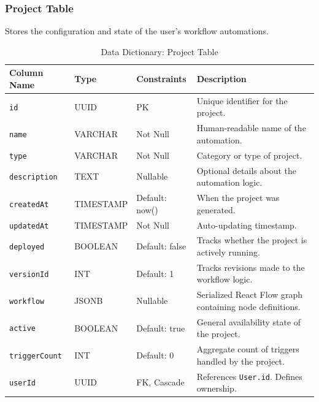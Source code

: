\subsubsection{Project Table}
Stores the configuration and state of the user's workflow automations.
\begin{table}[H]
\centering
\renewcommand{\arraystretch}{1.3}
\begin{tabularx}{\textwidth}{|l|l|l|X|}
\hline
\textbf{Column Name} & \textbf{Type} & \textbf{Constraints} & \textbf{Description} \\
\hline
\texttt{id} & UUID & PK & Unique identifier for the project. \\
\hline
\texttt{name} & VARCHAR & Not Null & Human-readable name of the automation. \\
\hline
\texttt{type} & VARCHAR & Not Null & Category or type of project. \\
\hline
\texttt{description} & TEXT & Nullable & Optional details about the automation logic. \\
\hline
\texttt{createdAt} & TIMESTAMP & Default: now() & When the project was generated. \\
\hline
\texttt{updatedAt} & TIMESTAMP & Not Null & Auto-updating timestamp. \\
\hline
\texttt{deployed} & BOOLEAN & Default: false & Tracks whether the project is actively running. \\
\hline
\texttt{versionId} & INT & Default: 1 & Tracks revisions made to the workflow logic. \\
\hline
\texttt{workflow} & JSONB & Nullable & Serialized React Flow graph containing node definitions. \\
\hline
\texttt{active} & BOOLEAN & Default: true & General availability state of the project. \\
\hline
\texttt{triggerCount} & INT & Default: 0 & Aggregate count of triggers handled by the project. \\
\hline
\texttt{userId} & UUID & FK, Cascade & References \texttt{User.id}. Defines ownership. \\
\hline
\end{tabularx}
\caption{Data Dictionary: Project Table}
\label{tab:dict-project}
\end{table}

